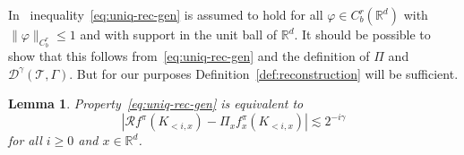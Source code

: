 \documentclass[11pt,a4paper]{article}
\newtheorem{lemma}[theorem]{Lemma}
\theoremstyle{remark}
\newcommand{\R}{\mathbb{R}}
\begin{document}
In~\cite{Hairer2013a} inequality~\eqref{eq:uniq-rec-gen} is assumed to hold for all $\varphi \in C^{r}_b ( \R^{d} )$ with $\| \varphi
  \|_{C^{r}_b} \leqslant 1$ and with support in the unit ball of $\R^{d}$. It should be possible to show that this follows from~\eqref{eq:uniq-rec-gen} and the definition of $\Pi$ and $\mathcal{D}^{\gamma} ( \mathcal{T}, \Gamma )$. But for our purposes Definition~\ref{def:reconstruction} will be sufficient.

\begin{lemma}
  \label{lemma:rec-equivalence}Property~{\eqref{eq:uniq-rec-gen}} is
  equivalent to
  \begin{equation}
    | \mathcal{R}f^{\pi} ( K_{< i,x} ) - \Pi_{x} f^{\pi}_{x} (
    K_{< i,x} ) | \lesssim 2^{-i \gamma} \label{eq:uniq-rec-LP}
  \end{equation}
  for all $i \geqslant 0$ and $x \in \R^{d}$. 
\end{lemma}
\end{document}
